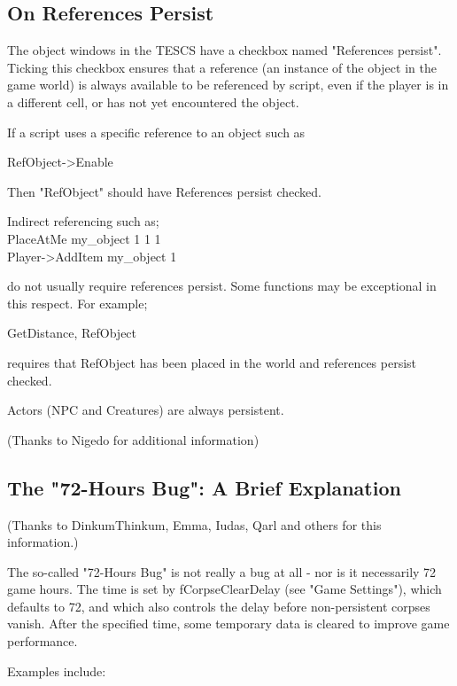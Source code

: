 \hypertarget{on-references-persist}{%
\subsection{\texorpdfstring{\hfill\break
On References
Persist}{ On References Persist}}\label{on-references-persist}}

The object windows in the TESCS have a checkbox named "References
persist". Ticking this checkbox ensures that a reference (an instance of
the object in the game world) is always available to be referenced by
script, even if the player is in a different cell, or has not yet
encountered the object.

If a script uses a specific reference to an object such as

RefObject-\textgreater Enable

Then "RefObject" should have References persist checked.

Indirect referencing such as;\\
PlaceAtMe my\_object 1 1 1\\
Player-\textgreater AddItem my\_object 1

do not usually require references persist. Some functions may be
exceptional in this respect. For example;

GetDistance, RefObject

requires that RefObject has been placed in the world and references
persist checked.

Actors (NPC and Creatures) are always persistent.

(Thanks to Nigedo for additional information)

\hypertarget{the-72-hours-bug-a-brief-explanation}{%
\subsection{The "72-Hours Bug": A Brief
Explanation}\label{the-72-hours-bug-a-brief-explanation}}

(Thanks to DinkumThinkum, Emma, Iudas, Qarl and others for this
information.)

The so-called "72-Hours Bug" is not really a bug at all - nor is it
necessarily 72 game hours. The time is set by fCorpseClearDelay (see
"Game Settings"), which defaults to 72, and which also controls the
delay before non-persistent corpses vanish. After the specified time,
some temporary data is cleared to improve game performance.

Examples include:

